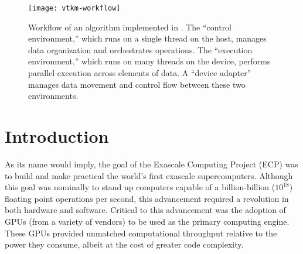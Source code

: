 

\begin{figure*}[tb]
  \texttt{[image: vtkm-workflow]}
  \caption{
    Workflow of an algorithm implemented in \vtkm.
    The ``control environment,'' which runs on a single thread on the host, manages data organization and orchestrates operations.
    The ``execution environment,'' which runs on many threads on the device, performs parallel execution across elements of data.
    A ``device adapter'' manages data movement and control flow between these two environments.
  }
  \label{fig:vtkm-workflow}
\end{figure*}


\section{Introduction}




As its name would imply, the goal of the Exascale Computing Project (ECP) was to build and make practical the world's first exascale supercomputers.
Although this goal was nominally to stand up computers capable of a billion-billion ($10^{18}$) floating point operations per second, this advancement required a revolution in both hardware and software.
Critical to this advancement was the adoption of GPUs (from a variety of vendors) to be used as the primary computing engine.
These GPUs provided unmatched computational throughput relative to the power they consume, albeit at the cost of greater code complexity.%

